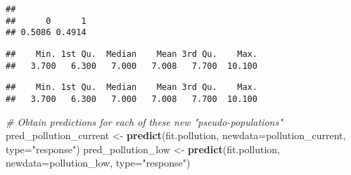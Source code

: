 \documentclass[
]{article}
\newenvironment{Shaded}{\begin{snugshade}}{\end{snugshade}}
\newcommand{\AttributeTok}[1]{\textcolor[rgb]{0.13,0.29,0.53}{#1}}
\newcommand{\CommentTok}[1]{\textcolor[rgb]{0.56,0.35,0.01}{\textit{#1}}}
\newcommand{\FunctionTok}[1]{\textcolor[rgb]{0.13,0.29,0.53}{\textbf{#1}}}
\newcommand{\NormalTok}[1]{#1}
\newcommand{\OtherTok}[1]{\textcolor[rgb]{0.56,0.35,0.01}{#1}}
\newcommand{\SpecialCharTok}[1]{\textcolor[rgb]{0.81,0.36,0.00}{\textbf{#1}}}
\newcommand{\StringTok}[1]{\textcolor[rgb]{0.31,0.60,0.02}{#1}}
\begin{document}
\begin{Shaded}
\end{Shaded}

\begin{verbatim}
## 
##      0      1 
## 0.5086 0.4914
\end{verbatim}

\begin{Shaded}
\end{Shaded}

\begin{verbatim}
##    Min. 1st Qu.  Median    Mean 3rd Qu.    Max. 
##   3.700   6.300   7.000   7.008   7.700  10.100
\end{verbatim}

\begin{Shaded}
\end{Shaded}

\begin{verbatim}
##    Min. 1st Qu.  Median    Mean 3rd Qu.    Max. 
##   3.700   6.300   7.000   7.008   7.700  10.100
\end{verbatim}

\begin{Shaded}
\begin{Highlighting}[]
\CommentTok{\# Obtain predictions for each of these new "pseudo{-}populations"}
\NormalTok{pred\_pollution\_current }\OtherTok{\textless{}{-}} \FunctionTok{predict}\NormalTok{(fit.pollution, }\AttributeTok{newdata=}\NormalTok{pollution\_current, }\AttributeTok{type=}\StringTok{"response"}\NormalTok{)}
\NormalTok{pred\_pollution\_low }\OtherTok{\textless{}{-}} \FunctionTok{predict}\NormalTok{(fit.pollution, }\AttributeTok{newdata=}\NormalTok{pollution\_low, }\AttributeTok{type=}\StringTok{"response"}\NormalTok{)}
\end{Highlighting}
\end{Shaded}
\end{document}
